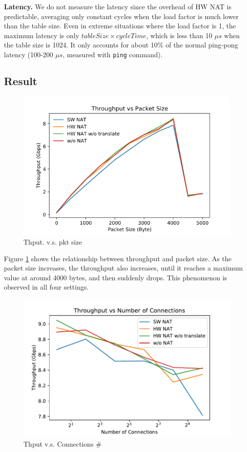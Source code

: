 \textbf{Latency.} We do not measure the latency since the overhead of HW NAT is predictable, averaging only constant cycles when the load factor is much lower than the table size. Even in extreme situations where the load factor is 1, the maximum latency is only $tableSize \times cycleTime$, which is less than 10 $\mu s$ when the table size is 1024. 
It only accounts for about 10\% of the normal ping-pong latency (100-200 $\mu s$, measured with \verb|ping| command). 

\subsection{Result}

\begin{figure}[t]
    \includegraphics[width=\linewidth]{images/Result1.png}
    \caption{Thput. v.s. pkt size}
    \label{fig:thputpktsize}
\end{figure}

Figure \ref{fig:thputpktsize} shows the relationship between throughput and packet size. As the packet size increases, the throughput also increases, until it reaches a maximum value at around 4000 bytes, and then suddenly drops. This phenomenon is observed in all four settings.

\begin{figure}[t]
    \includegraphics[width=\linewidth]{images/connection_throughput_log.pdf}
    \caption{Thput v.s. Connections \#}
    \label{fig:thputconn}
\end{figure}


